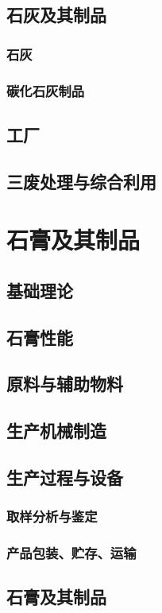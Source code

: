 \documentclass[UTF8]{../../ApplicationUniverse}
\begin{document}
    \subsection{石灰及其制品}
        \subsubsection{石灰}
        \subsubsection{碳化石灰制品}
    \subsection{工厂}
    \subsection{三废处理与综合利用}
\section{石膏及其制品}
    \subsection{基础理论}
    \subsection{石膏性能}
    \subsection{原料与辅助物料}
    \subsection{生产机械制造}
    \subsection{生产过程与设备}
        \subsubsection{取样分析与鉴定}
        \subsubsection{产品包装、贮存、运输}
    \subsection{石膏及其制品}
\end{document}
